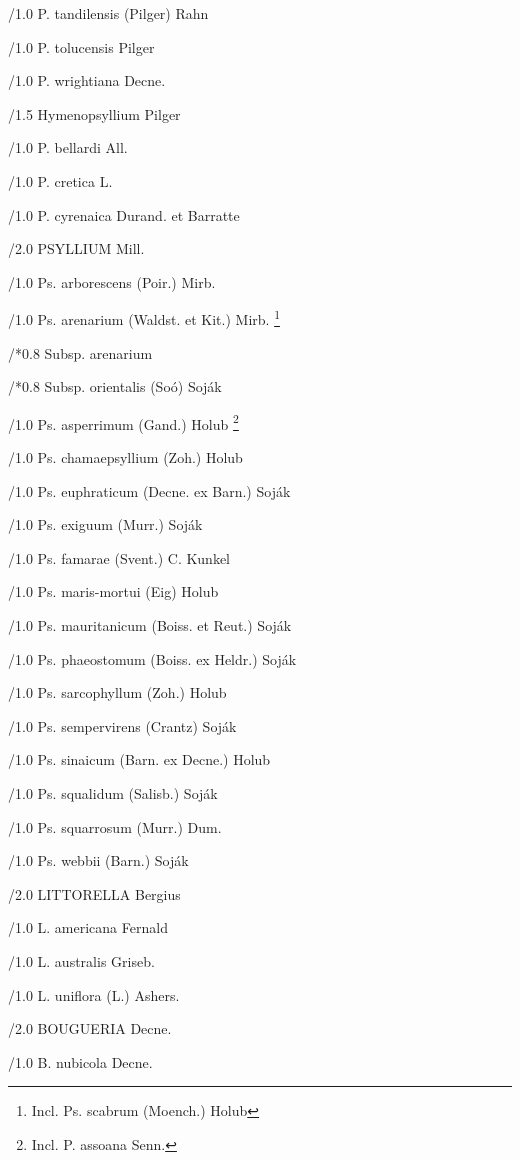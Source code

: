 \documentclass{article}
\begin{document}
\begin{classif}{1.0}
        /1.0 {P. tandilensis} (Pilger) Rahn

        /1.0 {P. tolucensis} Pilger

        /1.0 {P. wrightiana} Decne.

/1.5 Hymenopsyllium Pilger

        /1.0 {P. bellardi} All.

        /1.0 {P. cretica} L.

        /1.0 {P. cyrenaica} Durand. et Barratte

/2.0 PSYLLIUM Mill.

        /1.0 {Ps. arborescens} (Poir.) Mirb.

        /1.0 {Ps. arenarium} (Waldst. et Kit.) Mirb.
        \footnote{Incl. \KURN Ps. scabrum (Moench.) Holub}

        /*0.8 {Subsp.} arenarium

        /*0.8 {Subsp.} orientalis (So\'o) Soj\'ak

        /1.0 {Ps. asperrimum} (Gand.) Holub \footnote{Incl.
        \KURN P. assoana Senn.}

        /1.0 {Ps. chamaepsyllium} (Zoh.) Holub

        /1.0 {Ps. euphraticum} (Decne. ex Barn.) Soj\'ak

        /1.0 {Ps. exiguum} (Murr.) Soj\'ak

        /1.0 {Ps. famarae} (Svent.) C. Kunkel

        /1.0 {Ps. maris-mortui} (Eig) Holub

        /1.0 {Ps. mauritanicum} (Boiss. et Reut.) Soj\'ak

        /1.0 {Ps. phaeostomum} (Boiss. ex Heldr.) Soj\'ak

        /1.0 {Ps. sarcophyllum} (Zoh.) Holub

        /1.0 {Ps. sempervirens} (Crantz) Soj\'ak

        /1.0 {Ps. sinaicum} (Barn. ex Decne.) Holub

        /1.0 {Ps. squalidum} (Salisb.) Soj\'ak

        /1.0 {Ps. squarrosum} (Murr.) Dum.

        /1.0 {Ps. webbii} (Barn.) Soj\'ak

/2.0 LITTORELLA Bergius

        /1.0 {L. americana} Fernald

        /1.0 {L. australis} Griseb.

        /1.0 {L. uniflora} (L.) Ashers.

/2.0 BOUGUERIA Decne.

        /1.0 {B. nubicola} Decne.

\end{classif}
\end{document}
